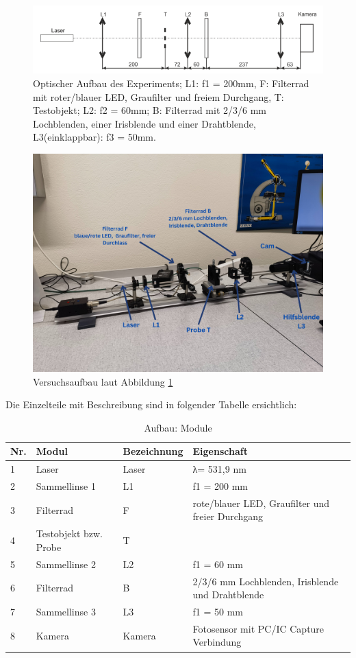 \documentclass[12pt,a4paper,twoside]{article}
\begin{document}
\begin{figure}[H]
    \centering
    \includegraphics[width=0.8\linewidth]{nudes/VersuchsaufbauTheoretisch.png}
    \caption{Optischer Aufbau des Experiments; L1: f1 = 200mm, F: Filterrad mit roter/blauer LED, Graufilter und freiem
    Durchgang, T: Testobjekt; L2: f2 = 60mm; B: Filterrad mit 2/3/6 mm Lochblenden, einer Irisblende und einer
    Drahtblende, L3(einklappbar): f3 = 50mm. \cite{teachcenter2}}
    \label{fig:VersuchsaufbauTheoretisch}
\end{figure}

\begin{figure}[H]
    \centering
    \includegraphics[width=0.7\linewidth]{nudes/VersuchsaufbauIRLbeschriftet.jpg}
    \caption{Versuchsaufbau laut Abbildung \ref{fig:VersuchsaufbauTheoretisch}}
    \label{fig:Versuchsaufbau}
\end{figure}

Die Einzelteile mit Beschreibung sind in folgender Tabelle ersichtlich:

\begin{table}[H]
    \centering
    \caption{Aufbau: Module}
    \label{tab:Aufbau}
    \begin{tabular}{| l | l | l | l |}
        \hline
        Nr.  & Modul & Bezeichnung  & Eigenschaft \\
        \hline
        1 & Laser & Laser & λ= 531,9 nm \\
        2 & Sammellinse 1 & L1 & f1 = 200 mm \\
        3 & Filterrad & F & rote/blauer LED, Graufilter und freier Durchgang \\
        4 & Testobjekt bzw. Probe & T &  \\
        5 & Sammellinse 2 & L2 & f1 = 60 mm \\
        6 & Filterrad & B & 2/3/6 mm Lochblenden, Irisblende und Drahtblende \\
        7 & Sammellinse 3 & L3 & f1 =  50 mm \\
        8 & Kamera & Kamera & Fotosensor mit PC/IC Capture Verbindung \\
        \hline
    \end{tabular}
\end{table}
\end{document}
